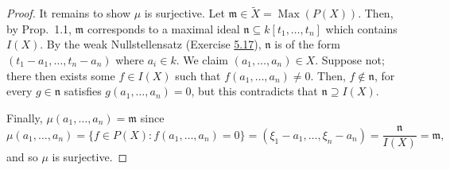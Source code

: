 \documentclass[12pt,letterpaper]{article}
\theoremstyle{definition}
\theoremstyle{remark}
\numberwithin{figure}{problem}
\numberwithin{equation}{section}
\DeclareMathOperator{\Max}{Max}
\begin{document}
\begin{proof}
  It remains to show $\mu$ is surjective. Let $\mathfrak{m} \in \tilde{X} = \Max(P(X))$. Then, by Prop.~1.1, $\mathfrak{m}$ corresponds to a maximal ideal $\mathfrak{n} \subseteq k[t_1,\ldots,t_n]$ which contains $I(X)$. By the weak Nullstellensatz (Exercise \href{AM 5 Integral Dependence and Valuations.pdf#exc:5.17}{5.17}), $\mathfrak{n}$ is of the form $(t_1 - a_1,\ldots,t_n-a_n)$ where $a_i \in k$. We claim $(a_1,\ldots,a_n) \in X$. Suppose not; there then exists some $f \in I(X)$ such that $f(a_1,\ldots,a_n) \ne 0$. Then, $f \notin \mathfrak{n}$, for every $g \in \mathfrak{n}$ satisfies $g(a_1,\ldots,a_n) = 0$, but this contradicts that $\mathfrak{n} \supseteq I(X)$.
  \par Finally, $\mu(a_1,\ldots,a_n) = \mathfrak{m}$ since
  \begin{equation*}
    \mu(a_1,\ldots,a_n) = \{f \in P(X) : f(a_1,\ldots,a_n) = 0\} = (\xi_1 - a_1,\ldots,\xi_n-a_n) = \frac{\mathfrak{n}}{I(X)} = \mathfrak{m},
  \end{equation*}
  and so $\mu$ is surjective.
\end{proof}
\end{document}
